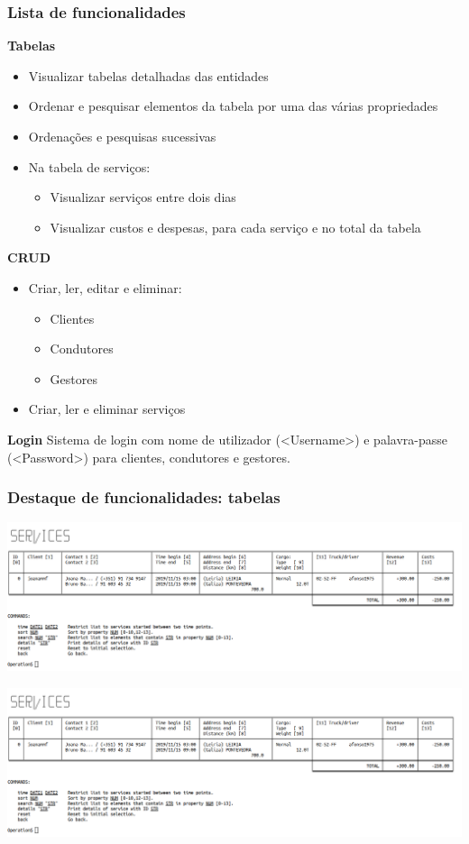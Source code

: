 \documentclass{beamer}
\def\texttt#1{<#1>}
\begin{document}
\begin{frame}
\frametitle{Lista de funcionalidades}
\textbf{Tabelas}
\begin{itemize}
	\item Visualizar tabelas detalhadas das entidades
	\item Ordenar e pesquisar elementos da tabela por uma das várias propriedades
	\item Ordenações e pesquisas sucessivas
	\item Na tabela de serviços:
	\begin{itemize}
		\item Visualizar serviços entre dois dias
		\item Visualizar custos e despesas, para cada serviço e no total da tabela
	\end{itemize} 
\end{itemize}
\textbf{CRUD}
\begin{itemize}
	\item Criar, ler, editar e eliminar:
	\begin{itemize}
		\item Clientes
		\item Condutores
		\item Gestores
	\end{itemize}
	\item Criar, ler e eliminar serviços
\end{itemize}
\textbf{Login}
Sistema de login com nome de utilizador (\texttt{Username}) e palavra-passe (\texttt{Password}) para clientes, condutores e gestores.
\end{frame}

\begin{frame}
\frametitle{Destaque de funcionalidades: tabelas}
\begin{center} \includegraphics[scale=0.26]{feature1.png} \end{center}
\end{frame}

\begin{frame}
\begin{center} \includegraphics[scale=0.26]{feature1.png} \end{center}
\end{frame}
\end{document}
